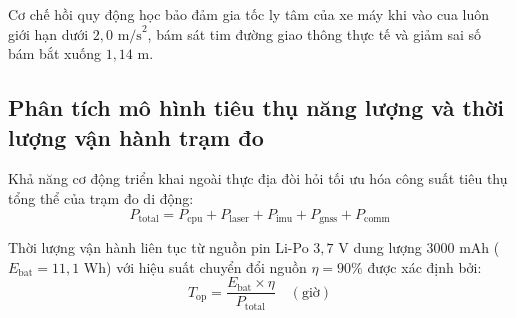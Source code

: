 Cơ chế hồi quy động học bảo đảm gia tốc ly tâm của xe máy khi vào cua luôn giới hạn dưới $2{,}0\text{ m/s}^2$, bám sát tim đường giao thông thực tế và giảm sai số bám bắt xuống $1{,}14$ m.

\subsection{Phân tích mô hình tiêu thụ năng lượng và thời lượng vận hành trạm đo}

\hspace{0.5cm} Khả năng cơ động triển khai ngoài thực địa đòi hỏi tối ưu hóa công suất tiêu thụ tổng thể của trạm đo di động:
\begin{equation}
P_{\text{total}} = P_{\text{cpu}} + P_{\text{laser}} + P_{\text{imu}} + P_{\text{gnss}} + P_{\text{comm}}
\label{eq:power-budget-formula-w14}
\end{equation}

Thời lượng vận hành liên tục từ nguồn pin Li-Po $3{,}7$ V dung lượng $3000$ mAh ($E_{\text{bat}} = 11{,}1$ Wh) với hiệu suất chuyển đổi nguồn $\eta = 90\%$ được xác định bởi:
\begin{equation}
T_{\text{op}} = \frac{E_{\text{bat}} \times \eta}{P_{\text{total}}} \quad (\text{giờ})
\label{eq:operational-battery-life-w14}
\end{equation}

\begin{table}[H]
\centering
\caption{Bảng ước lượng công suất tiêu thụ lý thuyết của các khối chức năng theo Datasheet nhà sản xuất}
\label{tab:power-consumption-breakdown-w14}
\end{table}

